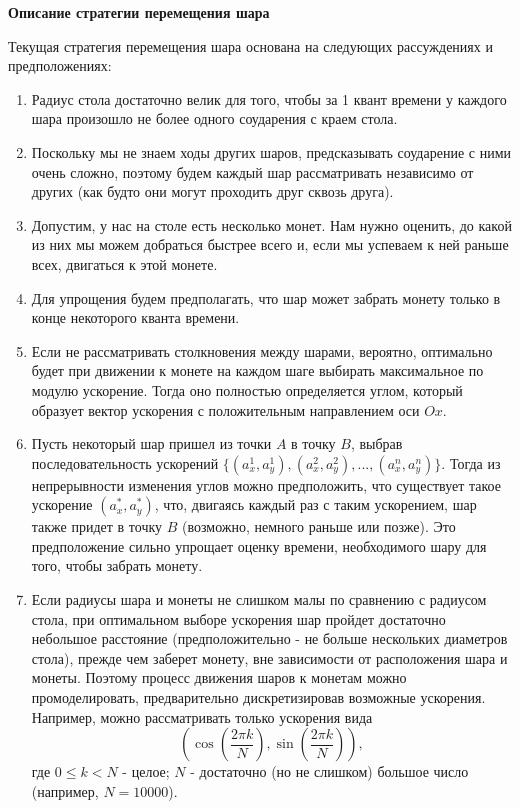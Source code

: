\documentclass[12pt,a4paper]{article}
\begin{document}
\begin{center}
    \Large \bf Описание стратегии перемещения шара
\end{center}

Текущая стратегия перемещения шара основана на следующих рассуждениях и предположениях:
\begin{enumerate} 
\item Радиус стола достаточно велик для того, чтобы за 1 квант времени у каждого шара произошло не более одного соударения с краем стола.
\item Поскольку мы не знаем ходы других шаров, предсказывать соударение с ними очень сложно, поэтому будем каждый шар рассматривать независимо от других (как будто они могут проходить друг сквозь друга).
\item Допустим, у нас на столе есть несколько монет. Нам нужно оценить, до какой из них мы можем добраться быстрее всего и, если мы успеваем к ней раньше всех, двигаться к этой монете.
\item Для упрощения будем предполагать, что шар может забрать монету только в конце некоторого кванта времени.
\item Если не рассматривать столкновения между шарами, вероятно, оптимально будет при движении к монете на каждом шаге выбирать максимальное по модулю ускорение. Тогда оно полностью определяется углом, который образует вектор ускорения с положительным направлением оси \(Ox\). 
\item Пусть некоторый шар пришел из точки \(A\) в точку \(B\), выбрав последовательность ускорений \(\{(a_x^1,a_y^1),(a_x^2,a_y^2),...,(a_x^n,a_y^n)\}\). Тогда из непрерывности изменения углов можно предположить, что существует такое ускорение \((a_x^*,a_y^*)\), что, двигаясь каждый раз с таким ускорением, шар также придет в точку \(B\) (возможно, немного раньше или позже). Это предположение сильно упрощает оценку времени, необходимого шару для того, чтобы забрать монету.
\item Если радиусы шара и монеты не слишком малы по сравнению с радиусом стола, при оптимальном выборе ускорения шар пройдет достаточно небольшое расстояние (предположительно - не больше нескольких диаметров стола), прежде чем заберет монету, вне зависимости от расположения шара и монеты. Поэтому процесс движения шаров к монетам можно промоделировать, предварительно дискретизировав возможные ускорения. Например, можно рассматривать только ускорения вида 
\[\left(\cos \left( \frac{2 \pi k}{N}  \right), \sin \left( \frac{2 \pi k}{N}  \right) \right),\]
где \(0 \le k<N\)  -  целое; \(N\) - достаточно (но не слишком) большое число (например, \(N=10000\)).
\end{enumerate}
\end{document}

